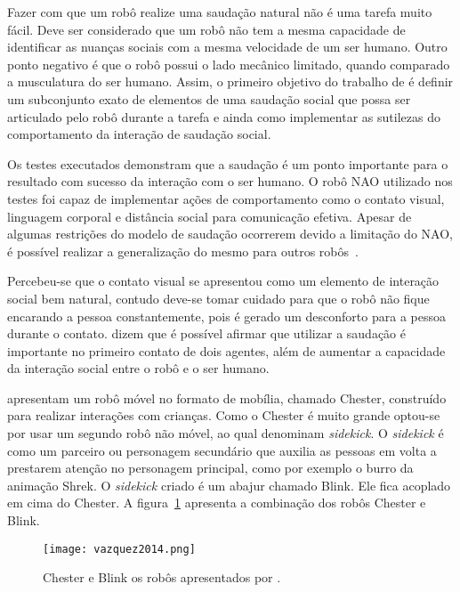 Fazer com que um robô realize uma saudação natural não é uma tarefa muito fácil. Deve ser considerado que um robô não tem a mesma capacidade de identificar as nuanças sociais com a mesma velocidade de um ser humano. Outro ponto negativo é que o robô possui o lado mecânico limitado, quando comparado a musculatura do ser humano. Assim, o primeiro objetivo do trabalho de  é definir um subconjunto exato de elementos de uma saudação social que possa ser articulado pelo robô durante a tarefa e ainda como implementar as sutilezas do comportamento da interação de saudação social.

Os testes executados demonstram que a saudação é um ponto importante para o resultado com sucesso da interação com o ser humano. O robô NAO utilizado nos testes foi capaz de implementar ações de comportamento como o contato visual, linguagem corporal e distância social para comunicação efetiva. Apesar de algumas restrições do modelo de saudação ocorrerem devido a limitação do NAO, é possível realizar a generalização do mesmo para outros robôs~\cite{Heenan:2014}.

Percebeu-se que o contato visual se apresentou como um elemento de interação social bem natural, contudo deve-se tomar cuidado para que o robô não fique encarando a pessoa constantemente, pois é gerado um desconforto para a pessoa durante o contato.  dizem que é possível afirmar que utilizar a saudação é importante no primeiro contato de dois agentes, além de aumentar a capacidade da interação social entre o robô e o ser humano.

 apresentam um robô móvel no formato de mobília, chamado Chester, construído para realizar interações com crianças. Como o Chester é muito grande optou-se por usar um segundo robô não móvel, ao qual  denominam \emph{sidekick}. O \emph{sidekick} é como um parceiro ou personagem secundário que auxilia as pessoas em volta a prestarem atenção no personagem principal, como por exemplo o burro da animação Shrek. O \emph{sidekick} criado é um abajur chamado Blink. Ele fica acoplado em cima do Chester. A figura~\ref{fig:vazquez} apresenta a combinação dos robôs Chester e Blink.

\begin{figure}[ht!]
	\centering
	\texttt{[image: vazquez2014.png]}
	\caption{Chester e Blink os robôs apresentados por .}
	\label{fig:vazquez}
\end{figure}

